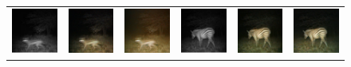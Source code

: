 \begin{figure}[htp!]
\begin{tabularx}{\textwidth}{Y Y Y !{\space} Y Y Y}
        \includegraphics{gfx/diffusion-sampling-full-vs-high-pass-filter-qual/nir_S2_B06_R1_PICT0128.jpg} & \includegraphics{gfx/diffusion-sampling-full-vs-high-pass-filter-qual/full-pass_S2_B06_R1_PICT0128.png} & \includegraphics{gfx/diffusion-sampling-full-vs-high-pass-filter-qual/high-pass_S2_B06_R1_PICT0128.png} & \includegraphics{gfx/diffusion-sampling-full-vs-high-pass-filter-qual/nir_S2_B06_R1_PICT0279.jpg} & \includegraphics{gfx/diffusion-sampling-full-vs-high-pass-filter-qual/full-pass_S2_B06_R1_PICT0279.png} & \includegraphics{gfx/diffusion-sampling-full-vs-high-pass-filter-qual/high-pass_S2_B06_R1_PICT0279.png} \\

\end{tabularx}
\end{figure}
